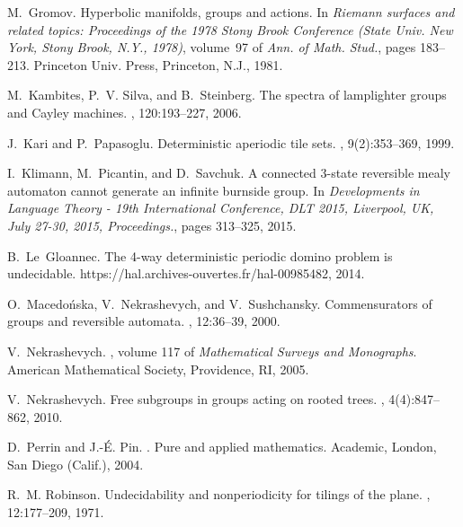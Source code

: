 \documentclass{amsart}
\begin{document}
{\begin{thebibliography}{10}
M.~Gromov.
\newblock Hyperbolic manifolds, groups and actions.
\newblock In {\em Riemann surfaces and related topics: {P}roceedings of the
  1978 {S}tony {B}rook {C}onference ({S}tate {U}niv. {N}ew {Y}ork, {S}tony
  {B}rook, {N}.{Y}., 1978)}, volume~97 of {\em Ann. of Math. Stud.}, pages
  183--213. Princeton Univ. Press, Princeton, N.J., 1981.

M.~Kambites, P.~V. Silva, and B.~Steinberg.
\newblock The spectra of lamplighter groups and {C}ayley machines.
, 120:193--227, 2006.

J.~Kari and P.~Papasoglu.
\newblock Deterministic aperiodic tile sets.
, 9(2):353--369, 1999.

I.~Klimann, M.~Picantin, and D.~Savchuk.
\newblock A connected 3-state reversible mealy automaton cannot generate an
  infinite burnside group.
\newblock In {\em Developments in Language Theory - 19th International
  Conference, {DLT} 2015, Liverpool, UK, July 27-30, 2015, Proceedings.}, pages
  313--325, 2015.

B.~Le~Gloannec.
\newblock The 4-way deterministic periodic domino problem is undecidable.
\newblock https://hal.archives-ouvertes.fr/hal-00985482, 2014.

O.~Macedo{\'n}ska, V.~Nekrashevych, and V.~Sushchansky.
\newblock Commensurators of groups and reversible automata.
,
  12:36--39, 2000.

V.~Nekrashevych.
, volume 117 of {\em Mathematical Surveys
  and Monographs}.
\newblock American Mathematical Society, Providence, RI, 2005.

V.~Nekrashevych.
\newblock Free subgroups in groups acting on rooted trees.
, 4(4):847--862, 2010.

D.~Perrin and J.-{\'E}. Pin.
.
\newblock Pure and applied mathematics. Academic, London, San Diego (Calif.),
  2004.

R.~M. Robinson.
\newblock Undecidability and nonperiodicity for tilings of the plane.
\newblock {\em Invent. Math.}, 12:177--209, 1971.


\end{thebibliography}}
\end{document}
